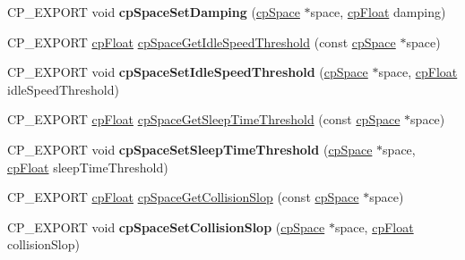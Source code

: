 \begin{DoxyCompactItemize}
\item 
\mbox{\label{group__cp_space_ga02641468aa07e3120d73b4d33cb7e780}} 
C\+P\+\_\+\+E\+X\+P\+O\+RT void {\bfseries cp\+Space\+Set\+Damping} (\mbox{\hyperlink{structcp_space}{cp\+Space}} $\ast$space, \mbox{\hyperlink{group__basic_types_gac1ed65573e035bf892505768c852d8d3}{cp\+Float}} damping)
\item 
C\+P\+\_\+\+E\+X\+P\+O\+RT \mbox{\hyperlink{group__basic_types_gac1ed65573e035bf892505768c852d8d3}{cp\+Float}} \mbox{\hyperlink{group__cp_space_ga256c38475826c4c165999079929fe1e7}{cp\+Space\+Get\+Idle\+Speed\+Threshold}} (const \mbox{\hyperlink{structcp_space}{cp\+Space}} $\ast$space)
\item 
\mbox{\label{group__cp_space_gacb84ce106473ddfeafafcf4a4cd67993}} 
C\+P\+\_\+\+E\+X\+P\+O\+RT void {\bfseries cp\+Space\+Set\+Idle\+Speed\+Threshold} (\mbox{\hyperlink{structcp_space}{cp\+Space}} $\ast$space, \mbox{\hyperlink{group__basic_types_gac1ed65573e035bf892505768c852d8d3}{cp\+Float}} idle\+Speed\+Threshold)
\item 
C\+P\+\_\+\+E\+X\+P\+O\+RT \mbox{\hyperlink{group__basic_types_gac1ed65573e035bf892505768c852d8d3}{cp\+Float}} \mbox{\hyperlink{group__cp_space_gab3f74ae04501ce532913c87e5be54a80}{cp\+Space\+Get\+Sleep\+Time\+Threshold}} (const \mbox{\hyperlink{structcp_space}{cp\+Space}} $\ast$space)
\item 
\mbox{\label{group__cp_space_gab593e909d82ad4824a7d1c2d6f397147}} 
C\+P\+\_\+\+E\+X\+P\+O\+RT void {\bfseries cp\+Space\+Set\+Sleep\+Time\+Threshold} (\mbox{\hyperlink{structcp_space}{cp\+Space}} $\ast$space, \mbox{\hyperlink{group__basic_types_gac1ed65573e035bf892505768c852d8d3}{cp\+Float}} sleep\+Time\+Threshold)
\item 
C\+P\+\_\+\+E\+X\+P\+O\+RT \mbox{\hyperlink{group__basic_types_gac1ed65573e035bf892505768c852d8d3}{cp\+Float}} \mbox{\hyperlink{group__cp_space_ga7b5e6178a021b1b6bba4b70876bf79d0}{cp\+Space\+Get\+Collision\+Slop}} (const \mbox{\hyperlink{structcp_space}{cp\+Space}} $\ast$space)
\item 
\mbox{\label{group__cp_space_gaa962f544b92ee508abd689729ceaaa9a}} 
C\+P\+\_\+\+E\+X\+P\+O\+RT void {\bfseries cp\+Space\+Set\+Collision\+Slop} (\mbox{\hyperlink{structcp_space}{cp\+Space}} $\ast$space, \mbox{\hyperlink{group__basic_types_gac1ed65573e035bf892505768c852d8d3}{cp\+Float}} collision\+Slop)

\end{DoxyCompactItemize}
